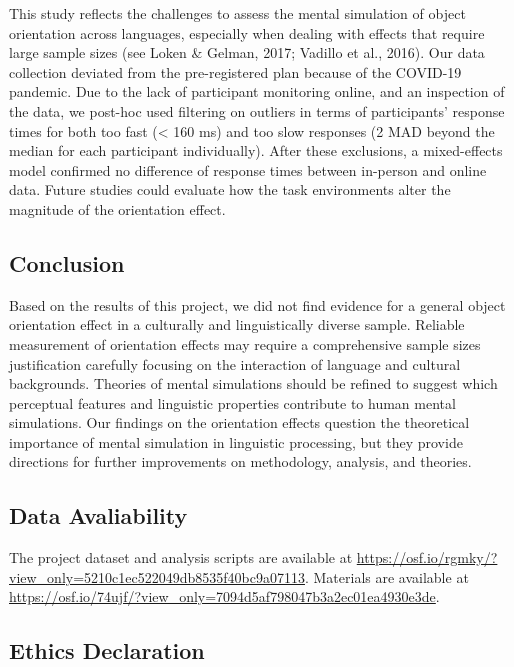 \documentclass[
  man,mask,floatsintext]{apa7}
\begin{document}
This study reflects the challenges to assess the mental simulation of
object orientation across languages, especially when dealing with
effects that require large sample sizes (see Loken \& Gelman, 2017; Vadillo et al., 2016). Our data collection deviated from
the pre-registered plan because of the COVID-19 pandemic. Due to the
lack of participant monitoring online, and an inspection of the data, we
post-hoc used filtering on outliers in terms of participants' response
times for both too fast (\textless{} 160 ms) and too slow responses (2 MAD beyond
the median for each participant individually). After these exclusions, a
mixed-effects model confirmed no difference of response times between
in-person and online data. Future studies could evaluate how the task
environments alter the magnitude of the orientation effect.

\hypertarget{conclusion}{%
\subsection{Conclusion}\label{conclusion}}

Based on the results of this project, we did not find evidence for a
general object orientation effect in a culturally and linguistically
diverse sample. Reliable measurement of orientation effects may require
a comprehensive sample sizes justification carefully focusing on the
interaction of language and cultural backgrounds. Theories of mental
simulations should be refined to suggest which perceptual features and
linguistic properties contribute to human mental simulations. Our
findings on the orientation effects question the theoretical importance
of mental simulation in linguistic processing, but they provide
directions for further improvements on methodology, analysis, and
theories.

\hypertarget{data-avaliability}{%
\subsection{Data Avaliability}\label{data-avaliability}}

The project dataset and analysis scripts are available at \url{https://osf.io/rgmky/?view_only=5210c1ec522049db8535f40bc9a07113}. Materials are available at \url{https://osf.io/74ujf/?view_only=7094d5af798047b3a2ec01ea4930e3de}.

\hypertarget{ethics-declaration}{%
\subsection{Ethics Declaration}\label{ethics-declaration}}
\end{document}
